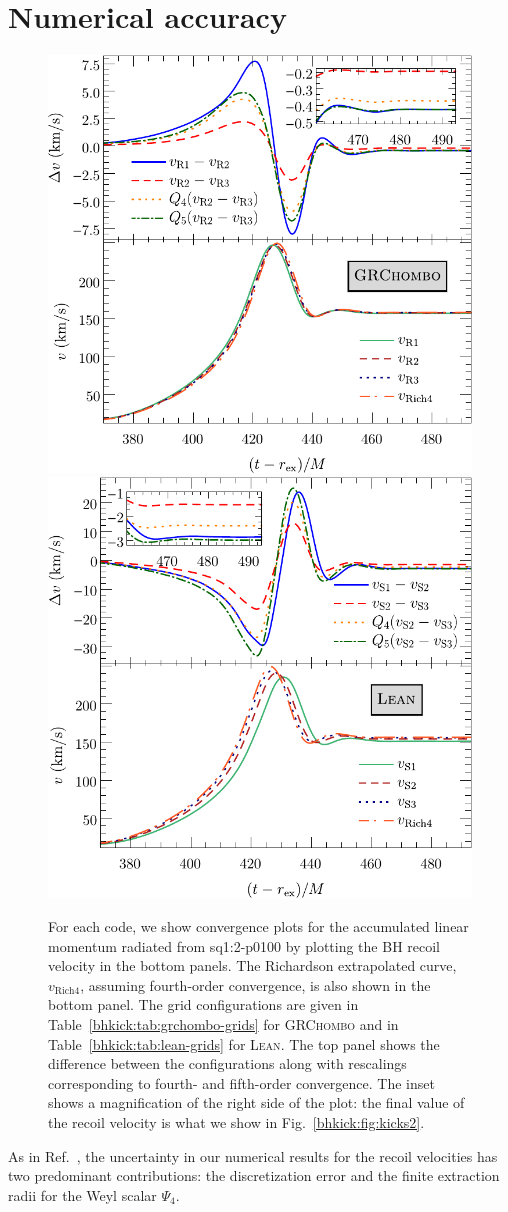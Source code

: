 


\section{Numerical accuracy}
\label{bhkick:sec:accuracy}
\begin{figure}[t]
    \subfloat%
    {
        \includegraphics[width=0.48\linewidth]{bhkick/grchombo-convergence5.pdf}
    }
    \hfill
    \subfloat%
    {
        \includegraphics[width=0.48\linewidth]{bhkick/lean-convergence4.pdf}
    }
    \caption{For each code, we show convergence plots for the
      accumulated linear momentum radiated from \textsf{sq1:2-p0100}
      by plotting the BH recoil velocity in the bottom panels. The
      Richardson extrapolated curve, $v_{\mathrm{Rich4}}$, assuming
      fourth-order convergence, is also shown in the bottom panel. The
      grid configurations are given in Table~\ref{bhkick:tab:grchombo-grids}
      for \textsc{GRChombo} and in Table~\ref{bhkick:tab:lean-grids} for
      \textsc{Lean}. The top panel shows the difference between the
      configurations along with rescalings corresponding to fourth- and
      fifth-order convergence. The inset shows a magnification of the
      right side of the plot: the final value of the recoil
      velocity is what we show in Fig.~\ref{bhkick:fig:kicks2}.} 
    \label{bhkick:fig:convergence}
\end{figure}
As in Ref.~\cite{Sperhake:2019wwo}, the uncertainty in our numerical results 
for the recoil velocities has two predominant contributions: the 
discretization error and the finite extraction radii for the Weyl scalar
$\Psi_4$.

